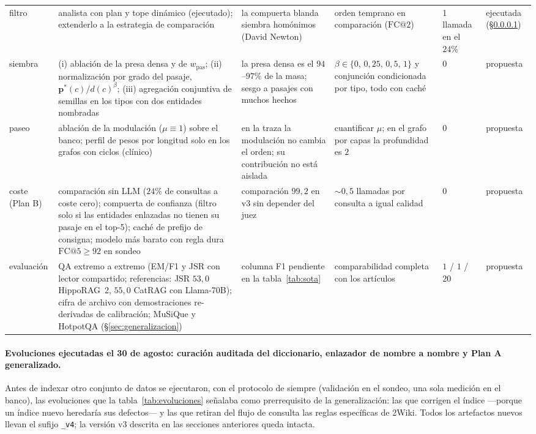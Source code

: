 \documentclass[11pt,a4paper]{article}
\newcommand{\hippo}{HippoRAG~2}
\begin{document}
\begin{table}[p]
\begin{tabular}{p{}p{}p{}p{}p{}p{}}
filtro & analista con plan y tope dinámico (ejecutado); extenderlo a la estrategia de comparación & la compuerta blanda siembra homónimos (David Newton) & orden temprano en comparación ($\mathrm{FC@}2$) & 1 llamada en el $24\%$ & ejecutada (\S\ref{sec:v4})\\
\addlinespace
siembra & (i) ablación de la presa densa y de $w_{\text{pas}}$; (ii) normalización por grado del pasaje, $\mathbf{p}^{*}(c)/d(c)^{\beta}$; (iii) agregación conjuntiva de semillas en los tipos con dos entidades nombradas & la presa densa es el $94$--$97\%$ de la masa; sesgo a pasajes con muchos hechos & $\beta\in\{0,\,0{,}25,\,0{,}5,\,1\}$ y conjunción condicionada por tipo, todo con caché & $0$ & propuesta\\
\addlinespace
paseo & ablación de la modulación ($\mu\equiv 1$) sobre el banco; perfil de pesos por longitud solo en los grafos con ciclos (clínico) & en la traza la modulación no cambia el orden; su contribución no está aislada & cuantificar $\mu$; en el grafo por capas la profundidad es $2$ & $0$ & propuesta\\
\addlinespace
coste (Plan B) & comparación sin LLM ($24\%$ de consultas a coste cero); compuerta de confianza (filtro solo si las entidades enlazadas no tienen su pasaje en el top-5); caché de prefijo de consigna; modelo más barato con regla dura $\mathrm{FC@}5\ge 92$ en sondeo & comparación $99{,}2$ en v3 sin depender del juez & $\sim 0{,}5$ llamadas por consulta a igual calidad & $0$ & propuesta\\
\addlinespace
evaluación & QA extremo a extremo (EM/F1 y JSR con lector compartido; referencias: JSR $53{,}0$ \hippo{}, $55{,}0$ CatRAG con Llama-70B); cifra de archivo con demostraciones re-derivadas de calibración; MuSiQue y HotpotQA (\S\ref{sec:generalizacion}) & columna F1 pendiente en la tabla~\ref{tab:sota} & comparabilidad completa con los artículos & $1$ / $1$ / $20$ & propuesta\\
\bottomrule
\end{tabular}
\end{table}

\paragraph{Evoluciones ejecutadas el 30 de agosto: curación auditada del
diccionario, enlazador de nombre a nombre y Plan A generalizado.}
\label{sec:v4}
Antes de indexar otro conjunto de datos se ejecutaron, con el protocolo de
siempre (validación en el sondeo, una sola medición en el banco), las
evoluciones que la tabla~\ref{tab:evoluciones} señalaba como prerrequisito de
la generalización: las que corrigen el índice ---porque un índice nuevo
heredaría sus defectos--- y las que retiran del flujo de consulta las reglas
específicas de 2Wiki. Todos los artefactos nuevos llevan el sufijo
\texttt{\_v4}; la versión v3 descrita en las secciones anteriores queda
intacta.
\end{document}

